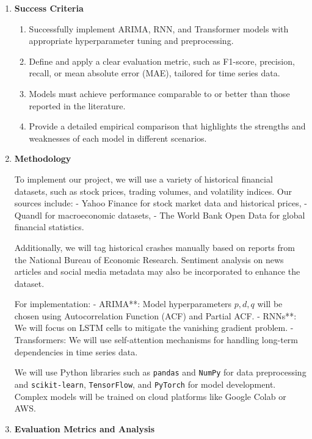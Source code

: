 \documentclass[12pt, letterpaper]{article}
\begin{document}
\begin{enumerate}[label=]
    \item \textbf{Success Criteria}

        \begin{enumerate}[label=-]
            \item Successfully implement ARIMA, RNN, and Transformer models with appropriate hyperparameter tuning and preprocessing.
            \item Define and apply a clear evaluation metric, such as F1-score, precision, recall, or mean absolute error (MAE), tailored for time series data.
            \item Models must achieve performance comparable to or better than those reported in the literature.
            \item Provide a detailed empirical comparison that highlights the strengths and weaknesses of each model in different scenarios.
        \end{enumerate}

    \item \textbf{Methodology}

        To implement our project, we will use a variety of historical financial datasets, such as stock prices, trading volumes, and volatility indices. Our sources include:
        - Yahoo Finance for stock market data and historical prices,
        - Quandl for macroeconomic datasets,
        - The World Bank Open Data for global financial statistics.

        Additionally, we will tag historical crashes manually based on reports from the National Bureau of Economic Research. Sentiment analysis on news articles and social media metadata may also be incorporated to enhance the dataset.

        For implementation:
        - ARIMA**: Model hyperparameters \( p, d, q \) will be chosen using Autocorrelation Function (ACF) and Partial ACF.
        - RNNs**: We will focus on LSTM cells to mitigate the vanishing gradient problem.
        - Transformers: We will use self-attention mechanisms for handling long-term dependencies in time series data.

        We will use Python libraries such as \texttt{pandas} and \texttt{NumPy} for data preprocessing and \texttt{scikit-learn}, \texttt{TensorFlow}, and \texttt{PyTorch} for model development. Complex models will be trained on cloud platforms like Google Colab or AWS.

    \item \textbf{Evaluation Metrics and Analysis}


\end{enumerate}
\end{document}
